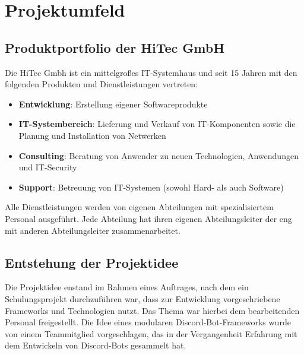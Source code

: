 
\section{Projektumfeld}\label{projektumfeld}

\subsection{Produktportfolio der HiTec GmbH}\label{produktportfolio-der-hitec-gmbh}
Die HiTec Gmbh ist ein mittelgroßes IT-Systemhaus und seit 15 Jahren mit den folgenden Produkten und Dienstleistungen vertreten:

\begin{itemize}
        \item \textbf{Entwicklung}: Erstellung eigener Softwareprodukte
        \item \textbf{IT-Systembereich}: Lieferung und Verkauf von IT-Komponenten sowie die Planung und Installation von Netwerken
         \item \textbf{Consulting}: Beratung von Anwender zu neuen Technologien, Anwendungen und IT-Security
          \item \textbf{Support}: Betreuung von IT-Systemen (sowohl Hard- als auch Software)
\end{itemize}

\pagebreak

Alle Dienstleistungen werden von eigenen Abteilungen mit spezialisiertem Personal ausgeführt. Jede Abteilung hat ihren eigenen Abteilungsleiter der eng mit anderen Abteilungsleiter zusammenarbeitet.

\subsection{Entstehung der Projektidee}\label{entstehung-der-projektidee}

Die Projektidee enstand im Rahmen eines Auftrages, nach dem ein Schulungsprojekt durchzuführen war, dass zur Entwicklung vorgeschriebene Frameworks und Technologien nutzt. Das Thema war hierbei dem bearbeitenden Personal freigestellt. Die Idee eines modularen Discord-Bot-Frameworks wurde von einem Teammitglied vorgeschlagen, das in der Vergangenheit Erfahrung mit dem Entwickeln von Discord-Bots gesammelt hat.
